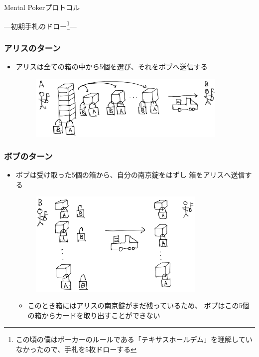 
\begin{frame}

  \centering
  {\huge Mental Pokerプロトコル}

  \vspace{1em}

  ---初期手札のドロー\footnote[frame]{この頃の僕はポーカーのルールである「テキサスホールデム」を理解していなかったので、手札を5枚ドローする}---
\end{frame}

\begin{frame}
  \frametitle{\showAndIncrement アリスのターン}

  \begin{itemize}
    \item アリスは全ての箱の中から5個を選び、それをボブへ送信する
    \begin{figure}[h]
      \includegraphics[width=0.9\textwidth]{img/select_boxes.png}
    \end{figure}
  \end{itemize}
\end{frame}

\begin{frame}
  \frametitle{\showIndex ボブのターン}

  \begin{itemize}
    \item<+-> ボブは受け取った5個の箱から、自分の南京錠をはずし
    箱をアリスへ送信する
    \begin{figure}[h]
      \includegraphics[width=0.8\textwidth]{img/unlock_b.png}
    \end{figure}
    \begin{itemize}
      \item<+-> このとき箱にはアリスの南京錠がまだ残っているため、
      ボブはこの5個の箱からカードを取り出すことができない
    \end{itemize}
  \end{itemize}
\end{frame}

